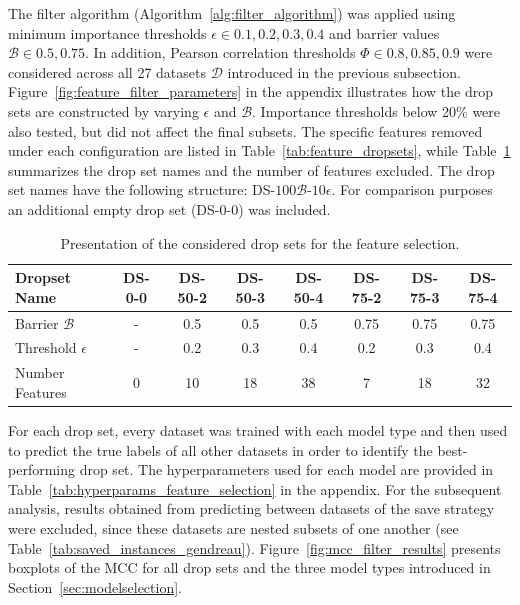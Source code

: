 The filter algorithm (Algorithm~\ref{alg:filter_algorithm}) was applied using minimum importance thresholds $\epsilon \in {0.1, 0.2, 0.3, 0.4}$
and barrier values $\mathcal{B} \in {0.5, 0.75}$. In addition, Pearson correlation thresholds $\Phi \in {0.8, 0.85, 0.9}$ were considered
across all 27 datasets $\mathcal{D}$ introduced in the previous subsection. Figure~\ref{fig:feature_filter_parameters} in the appendix
illustrates how the drop sets are constructed by varying $\epsilon$ and $\mathcal{B}$. Importance thresholds below 20\% were also tested, but
did not affect the final subsets. The specific features removed under each configuration are listed in Table~\ref{tab:feature_dropsets},
while Table~\ref{tab:drop_set_presentation_shortened} summarizes the drop set names and the number of features excluded. The drop set
names have the following structure: DS-$100\mathcal{B}$-$10\epsilon$. For comparison purposes an additional empty drop set (DS-0-0) was included.

\begin{table}[ht]
    \centering
    \small
    \begin{tabular}{l c c c c c c c}
        \toprule
        Dropset Name          & DS-0-0 & DS-50-2 & DS-50-3 & DS-50-4 & DS-75-2 & DS-75-3 & DS-75-4 \\
        \midrule
        Barrier $\mathcal{B}$ & -      & 0.5     & 0.5     & 0.5     & 0.75    & 0.75    & 0.75    \\
        Threshold $\epsilon$  & -      & 0.2     & 0.3     & 0.4     & 0.2     & 0.3     & 0.4     \\
        Number Features       & 0      & 10      & 18      & 38      & 7       & 18      & 32      \\
        \bottomrule
    \end{tabular}
    \caption{Presentation of the considered drop sets for the feature selection.}
    \label{tab:drop_set_presentation_shortened}
\end{table}
For each drop set, every dataset was trained with each model type and then used to predict the
true labels of all other datasets in order to identify the best-performing drop set. The hyperparameters used for
each model are provided in Table~\ref{tab:hyperparams_feature_selection} in the appendix. For the subsequent analysis,
results obtained from predicting between datasets of the save strategy were excluded, since these datasets are nested
subsets of one another (see Table~\ref{tab:saved_instances_gendreau}). Figure~\ref{fig:mcc_filter_results} presents boxplots of
the \gls{MCC} for all drop sets and the three model types introduced in Section~\ref{sec:modelselection}.

